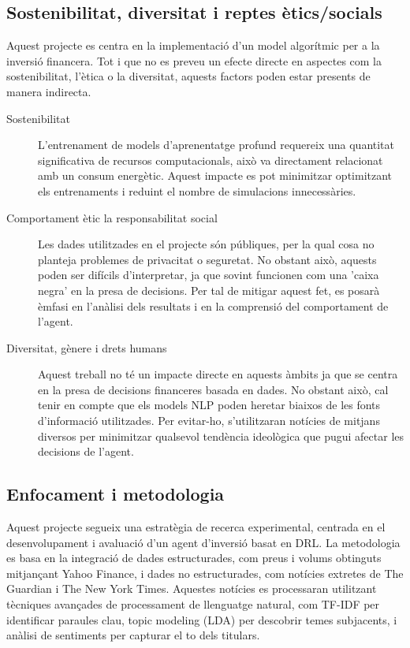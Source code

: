 \documentclass[12pt,a4paper,twoside]{book}
\begin{document}
\subsection{Sostenibilitat, diversitat i reptes ètics/socials}

Aquest projecte es centra en la implementació d'un model algorítmic per a la inversió financera. Tot i que no es preveu un efecte directe en aspectes com la sostenibilitat, l'ètica o la diversitat, aquests factors poden estar presents de manera indirecta.

\begin{description}
    \item[Sostenibilitat] L'entrenament de models d'aprenentatge profund requereix una quantitat significativa de recursos computacionals, això va directament relacionat amb un consum energètic. Aquest impacte es pot minimitzar optimitzant els entrenaments i reduint el nombre de simulacions innecessàries.
    \item[Comportament ètic la responsabilitat social] Les dades utilitzades en el projecte són públiques, per la qual cosa no planteja problemes de privacitat o seguretat. No obstant això, aquests poden ser difícils d'interpretar, ja que sovint funcionen com una 'caixa negra' en la presa de decisions. Per tal de mitigar aquest fet, es posarà èmfasi en l'anàlisi dels resultats i en la comprensió del comportament de l'agent.
    \item[Diversitat, gènere i drets humans] Aquest treball no té un impacte directe en aquests àmbits ja que se centra en la presa de decisions financeres basada en dades. No obstant això, cal tenir en compte que els models NLP poden heretar biaixos de les fonts d'informació utilitzades. Per evitar-ho, s'utilitzaran notícies de mitjans diversos per minimitzar qualsevol tendència ideològica que pugui afectar les decisions de l'agent.
\end{description}

\subsection{Enfocament i metodologia}

Aquest projecte segueix una estratègia de recerca experimental, centrada en el desenvolupament i avaluació d'un agent d'inversió basat en DRL. La metodologia es basa en la integració de dades estructurades, com preus i volums obtinguts mitjançant Yahoo Finance\cite{YahooFinance}, i dades no estructurades, com notícies extretes de The Guardian\cite{TheGuardian} i The New York Times\cite{NYTimes}. Aquestes notícies es processaran utilitzant tècniques avançades de processament de llenguatge natural, com TF-IDF per identificar paraules clau, topic modeling (LDA) per descobrir temes subjacents, i anàlisi de sentiments per capturar el to dels titulars.
\end{document}
